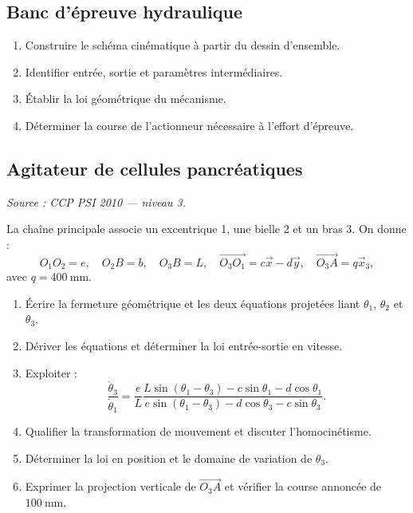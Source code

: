 \subsection{Banc d'épreuve hydraulique}

\begin{center}
\hfill
{}\hfill
{}\hfill
{}
\end{center}

\begin{enumerate}
  \item Construire le schéma cinématique à partir du dessin d'ensemble.
  \item Identifier entrée, sortie et paramètres intermédiaires.
  \item Établir la loi géométrique du mécanisme.
  \item Déterminer la course de l'actionneur nécessaire à l'effort d'épreuve.
\end{enumerate}

\subsection{Agitateur de cellules pancréatiques}

\textit{Source : CCP PSI 2010 — niveau 3.}

La chaîne principale associe un excentrique 1, une bielle 2 et un bras 3.
On donne :
\[
O_1O_2=e,\quad O_2B=b,\quad O_3B=L,
\quad \overrightarrow{O_3O_1}=c\vec x-d\vec y,
\quad \overrightarrow{O_3A}=q\vec x_3,
\]
avec $q=400\ \mathrm{mm}$.


\begin{enumerate}
  \item Écrire la fermeture géométrique et les deux équations projetées liant $\theta_1$, $\theta_2$ et $\theta_3$.
  \item Dériver les équations et déterminer la loi entrée-sortie en vitesse.
  \item Exploiter :
  \[
  \frac{\dot\theta_3}{\dot\theta_1}
  =\frac{e}{L}
  \frac{L\sin(\theta_1-\theta_3)-c\sin\theta_1-d\cos\theta_1}
  {e\sin(\theta_1-\theta_3)-d\cos\theta_3-c\sin\theta_3}.
  \]
  \item Qualifier la transformation de mouvement et discuter l'homocinétisme.
  \item Déterminer la loi en position et le domaine de variation de $\theta_3$.
  \item Exprimer la projection verticale de $\overrightarrow{O_3A}$ et vérifier la course annoncée de $100\ \mathrm{mm}$.
\end{enumerate}
